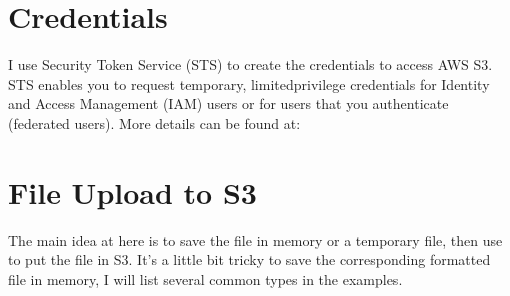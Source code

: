 \documentclass[letterpaper,12pt,english]{sphinxmanual}
\begin{document}
\section{Credentials}
\label{\detokenize{s3:credentials}}
\sphinxAtStartPar
I use Security Token Service (STS) to create the credentials to access AWS S3.
STS enables you to request temporary, limited\sphinxhyphen{}privilege credentials for
Identity and Access Management (IAM) users or for users that you
authenticate (federated users). More details can be found at:

\begin{sphinxVerbatim}[commandchars=\\\{\}]
 

  \PYGZbs{}
  \PYG{p}{[}\PYG{p}{]}
\end{sphinxVerbatim}


\section{File Upload to S3}
\label{\detokenize{s3:file-upload-to-s3}}
\sphinxAtStartPar
The main idea at here is to save the file in memory or a temporary file, then
use  to put the file in S3. It’s a little bit tricky to save the
corresponding formatted file in memory, I will list several common types in the
examples.
\end{document}
